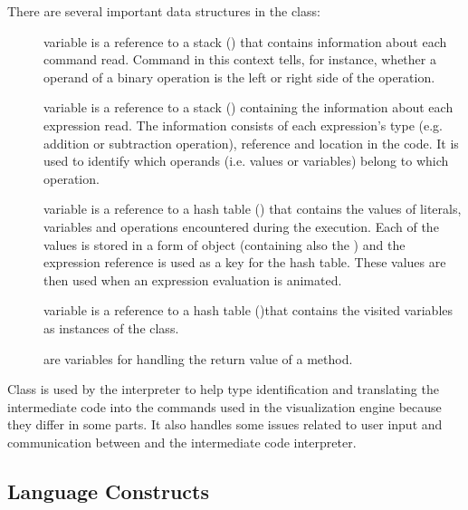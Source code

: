 There are several important data structures in the  class:
\begin{description}
\item[] variable is a reference to a stack ()
that contains information about each command read. Command in this
context tells, for instance, whether a operand of a binary
operation is the left or right side of the operation.
\item[] variable is a reference to a stack ()
containing the information about each expression read. The
information consists of each expression's type (e.g. addition or
subtraction operation), reference and location in the code. It is
used to identify which operands (i.e. values or variables) belong
to which operation. \item[] variable is a reference to a
hash table () that contains the values of literals,
variables and operations encountered during the execution. Each of
the values is stored in a form of  object (containing
also the ) and the expression reference is used as a key
for the hash table. These values are then used when an expression
evaluation is animated. \item[] variable is a
reference to a hash table ()that contains the visited
variables as instances of the  class.
\item[] \item[]
\item[] \item[] \item[]
\item[] \item[]
\item[] are variables for handling the return
value of a method.
\end{description}

Class  is used by the interpreter to help type identification and
translating the intermediate code into the commands used in the visualization engine because they differ in some parts. It also handles some issues related to user input
and communication between \djava{} and the intermediate code interpreter.

\subsection{Language Constructs}
\label{sec:Language_package}

